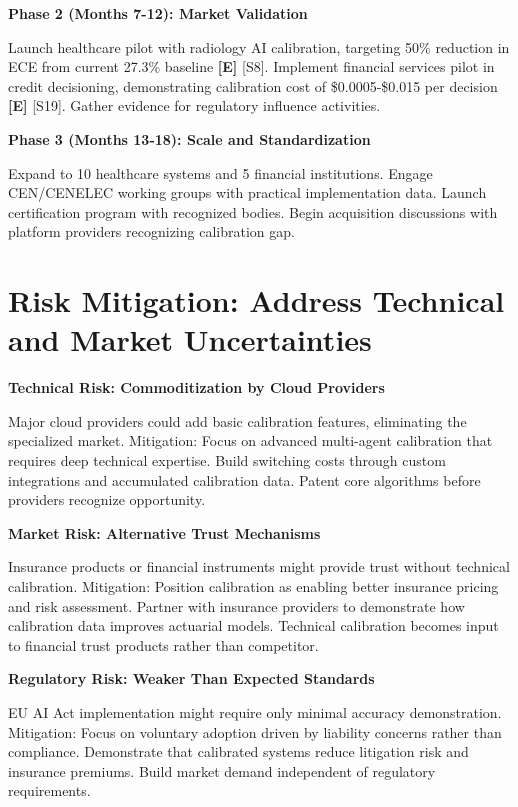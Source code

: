 \documentclass[a4paper,11pt]{article}
\newcommand{\elabel}{\textbf{\textcolor{ecolor}{[E]}}}
\begin{document}
\textbf{Phase 2 (Months 7-12): Market Validation}\par
Launch healthcare pilot with radiology AI calibration, targeting 50\% reduction in ECE from current 27.3\% baseline \elabel{} \textcolor{primary}{[S8]}. Implement financial services pilot in credit decisioning, demonstrating calibration cost of \$0.0005-\$0.015 per decision \elabel{} \textcolor{primary}{[S19]}. Gather evidence for regulatory influence activities.


\textbf{Phase 3 (Months 13-18): Scale and Standardization}\par
Expand to 10 healthcare systems and 5 financial institutions. Engage CEN/CENELEC working groups with practical implementation data. Launch certification program with recognized bodies. Begin acquisition discussions with platform providers recognizing calibration gap.


\section{Risk Mitigation: Address Technical and Market Uncertainties}

\textbf{Technical Risk: Commoditization by Cloud Providers}\par
Major cloud providers could add basic calibration features, eliminating the specialized market. Mitigation: Focus on advanced multi-agent calibration that requires deep technical expertise. Build switching costs through custom integrations and accumulated calibration data. Patent core algorithms before providers recognize opportunity.


\textbf{Market Risk: Alternative Trust Mechanisms}\par
Insurance products or financial instruments might provide trust without technical calibration. Mitigation: Position calibration as enabling better insurance pricing and risk assessment. Partner with insurance providers to demonstrate how calibration data improves actuarial models. Technical calibration becomes input to financial trust products rather than competitor.


\textbf{Regulatory Risk: Weaker Than Expected Standards}\par
EU AI Act implementation might require only minimal accuracy demonstration. Mitigation: Focus on voluntary adoption driven by liability concerns rather than compliance. Demonstrate that calibrated systems reduce litigation risk and insurance premiums. Build market demand independent of regulatory requirements.
\end{document}
